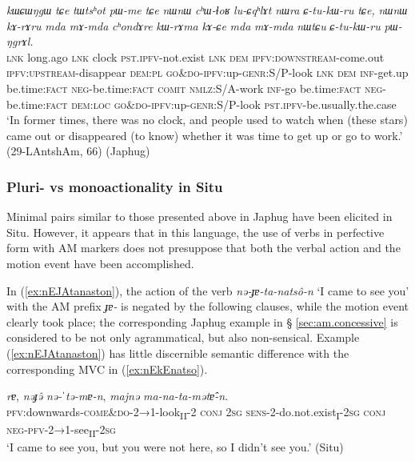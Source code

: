 \documentclass[oneside,a4paper,11pt]{article}
\newcommand{\ipa}[1]{{\phon\textit{#1}}}
\newcommand{\sens}[1]{‘#1’}
\newcommand{\rouge}[1]{{\color{red}#1}}
\begin{document}
 \begin{exe}
\ex \label{ex:kWrAma.kACe}
\gll  \ipa{tɕe}	\ipa{kɯɕɯŋgɯ}	\ipa{tɕe}	\ipa{tɯtsʰot}	\ipa{pɯ-me}	\ipa{tɕe}	\ipa{nɯnɯ}	\ipa{cʰɯ-ɬoʁ}	\ipa{lu-ɕqʰlɤt}	\ipa{nɯra}	\ipa{ɕ-tu-kɯ-ru}	\ipa{tɕe,}	\ipa{nɯnɯ}	\ipa{kɤ-rɤru}	\ipa{mda}	\ipa{mɤ-mda}	\ipa{cʰondɤre}	\ipa{kɯ-rɤma}	\ipa{kɤ-ɕe}	\ipa{mda}	\ipa{mɤ-mda}	\ipa{nɯtɕu}	\ipa{ɕ-tu-kɯ-ru}	\ipa{pɯ-ŋgrɤl.} \\
 \textsc{lnk} long.ago \textsc{lnk} clock \textsc{pst}.\textsc{ipfv}-not.exist \textsc{lnk} \textsc{dem} \textsc{ipfv}:\textsc{downstream}-come.out \textsc{ipfv}:\textsc{upstream}-disappear \textsc{dem}:\textsc{pl} \textsc{go\&do}-\textsc{ipfv}:up-\textsc{genr}:S/P-look \textsc{lnk} \textsc{dem} \textsc{inf}-get.up be.time:\textsc{fact} \textsc{neg}-be.time:\textsc{fact} \textsc{comit} \textsc{nmlz}:S/A-work \textsc{inf}-go be.time:\textsc{fact} \textsc{neg}-be.time:\textsc{fact} \textsc{dem}:\textsc{loc} \textsc{go\&do}-\textsc{ipfv}:up-\textsc{genr}:S/P-look \textsc{pst}.\textsc{ipfv}-be.usually.the.case  \\
 \glt  `In former times, there was no clock, and people used to watch when (these stars) came out or disappeared (to know) whether it was time to get up or go to work.' (29-LAntshAm, 66) (Japhug)
  \end{exe}
  
\subsubsection{Pluri- vs monoactionality in Situ} \label{sec:am.situ}
Minimal pairs similar to those presented above in Japhug have been elicited in Situ. However, it appears that in this language, the use of verbs in perfective form with AM markers does not presuppose that both the verbal action and the motion event have been accomplished. 


In (\ref{ex:nEJAtanaston}), the action of the verb \ipa{nə-ɟɐ-ta-natsô-n}  `I came to see you' with the AM prefix \ipa{ɟɐ-} is negated by the following clauses, while the motion event clearly took place; the corresponding Japhug example in § \ref{sec:am.concessive} is considered to be not only agrammatical, but also non-sensical. Example (\ref{ex:nEJAtanaston}) has little discernible semantic difference with the corresponding MVC in (\ref{ex:nEkEnatso}).
 

\begin{exe}
\ex \label{ex:nEJAtanaston}
\gll \ipa{nə-\rouge{ɟɐ}-ta-natsô-n} \ipa{rɐ}, \ipa{nəɟə̂} \ipa{nə-ˈtə-mɐ-n}, \ipa{majnə} \ipa{ma-na-ta-mətɐ̂-n}.\\
\textsc{pfv}:downwards-\textsc{\rouge{come\&do}}-2→1-look\textsubscript{II}-2 \textsc{conj} \textsc{2sg} \textsc{sens}-2-do.not.exist\textsubscript{I}-\textsc{2sg} \textsc{conj} \textsc{neg}-\textsc{pfv}-2→1-see\textsubscript{II}-\textsc{2sg}\\
\glt  \sens{I came to see you, but you were not here, so I didn't see you.} (Situ)
\end{exe}
\end{document}
